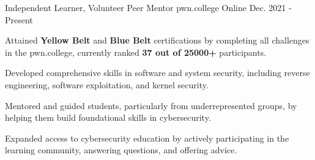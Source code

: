 \begin{cventries}
  \cventry
    {Independent Learner, Volunteer Peer Mentor} %
    {pwn.college} %
    {Online} %
    {Dec. 2021 - Present} %
    {
      \begin{cvitems} %
        \item {Attained \textbf{Yellow Belt} and \textbf{Blue Belt} certifications by completing all challenges in the pwn.college, currently ranked \textbf{37 out of 25000+} participants.}
        \item {Developed comprehensive skills in software and system security, including reverse engineering, software exploitation, and kernel security.}
        \item {Mentored and guided students, particularly from underrepresented groups, by helping them build foundational skills in cybersecurity.}
        \item {Expanded access to cybersecurity education by actively participating in the learning community, answering questions, and offering advice.}
      \end{cvitems}
    }

\end{cventries}
